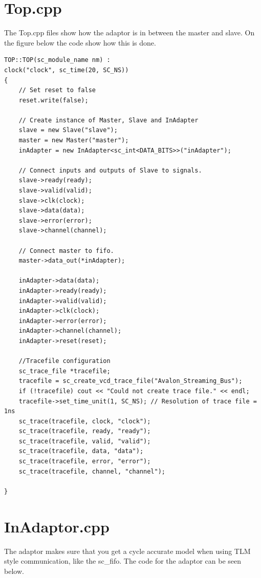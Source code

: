 \section{Top.cpp}
The Top.cpp files show how the adaptor is in between the master and slave. On the figure below the code show how this is done.


\begin{lstlisting}
TOP::TOP(sc_module_name nm) :
clock("clock", sc_time(20, SC_NS))
{
	// Set reset to false
	reset.write(false);
	
	// Create instance of Master, Slave and InAdapter
	slave = new Slave("slave");
	master = new Master("master");
	inAdapter = new InAdapter<sc_int<DATA_BITS>>("inAdapter");
	
	// Connect inputs and outputs of Slave to signals.
	slave->ready(ready);
	slave->valid(valid);
	slave->clk(clock);
	slave->data(data);
	slave->error(error);
	slave->channel(channel);
	
	// Connect master to fifo.
	master->data_out(*inAdapter);
	
	inAdapter->data(data);
	inAdapter->ready(ready);
	inAdapter->valid(valid);
	inAdapter->clk(clock);
	inAdapter->error(error);
	inAdapter->channel(channel);
	inAdapter->reset(reset);
	
	//Tracefile configuration
	sc_trace_file *tracefile;
	tracefile = sc_create_vcd_trace_file("Avalon_Streaming_Bus");
	if (!tracefile) cout << "Could not create trace file." << endl;
	tracefile->set_time_unit(1, SC_NS); // Resolution of trace file = 1ns
	sc_trace(tracefile, clock, "clock");
	sc_trace(tracefile, ready, "ready");
	sc_trace(tracefile, valid, "valid");
	sc_trace(tracefile, data, "data");
	sc_trace(tracefile, error, "error");
	sc_trace(tracefile, channel, "channel");

}
\end{lstlisting}

\section{InAdaptor.cpp}
The adaptor makes sure that you get a cycle accurate model when using TLM style communication, like the sc\_fifo. The code for the adaptor can be seen below.

